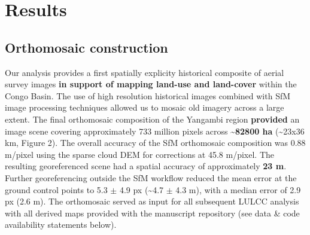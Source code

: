 \documentclass[remote sensing,article,submit,moreauthors,pdftex]{mdpi}
\begin{document}
\hypertarget{results}{%
\section{Results}\label{results}}

\hypertarget{orthomosaic-construction}{%
\subsection{Orthomosaic construction}\label{orthomosaic-construction}}

Our analysis provides a first spatially explicity historical composite
of aerial survey images \textbf{in support of mapping land-use and
land-cover} within the Congo Basin. The use of high resolution
historical images combined with SfM image processing techniques allowed
us to mosaic old imagery across a large extent. The final orthomosaic
composition of the Yangambi region \textbf{provided} an image scene
covering approximately 733 million pixels across
\textbf{\textasciitilde{}82800 ha} (\textasciitilde{}23x36 km, Figure
2). The overall accuracy of the SfM orthomosaic composition was 0.88
m/pixel using the sparse cloud DEM for corrections at 45.8 m/pixel. The
resulting georeferenced scene had a spatial accuracy of approximately
\textbf{23 m}. Further georeferencing outside the SfM workflow reduced
the mean error at the ground control points to 5.3 \(\pm\) 4.9 px
(\textasciitilde{}4.7 \(\pm\) 4.3 m), with a median error of 2.9 px (2.6
m). The orthomosaic served as input for all subsequent LULCC analysis
with all derived maps provided with the manuscript repository (see data
\& code availability statements below).
\end{document}
